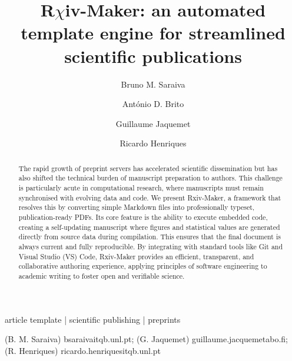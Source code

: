 \documentclass[times, twoside]{rxiv_maker_style}
\begin{document}
\title{{\color{red}R}$\chi$iv-Maker: an automated template engine for streamlined scientific publications}



\author[1,\Letter]{Bruno M. Saraiva}
\author[1]{António D. Brito}
\author[2,3,4,\Letter]{Guillaume Jaquemet}
\author[1,5,\Letter]{Ricardo Henriques}

\maketitle

\begin{abstract}

The rapid growth of preprint servers has accelerated scientific dissemination but has also shifted the technical burden of manuscript preparation to authors. This challenge is particularly acute in computational research, where manuscripts must remain synchronised with evolving data and code. We present Rxiv-Maker, a framework that resolves this by converting simple Markdown files into professionally typeset, publication-ready PDFs. Its core feature is the ability to execute embedded code, creating a self-updating manuscript where figures and statistical values are generated directly from source data during compilation. This ensures that the final document is always current and fully reproducible. By integrating with standard tools like Git and Visual Studio (VS) Code, Rxiv-Maker provides an efficient, transparent, and collaborative authoring experience, applying principles of software engineering to academic writing to foster open and verifiable science.

\end{abstract}

\begin{keywords}
article template | scientific publishing | preprints
\end{keywords}

\begin{corrauthor}
(B. M. Saraiva) bsaraiva\at itqb.unl.pt; 
(G. Jaquemet) guillaume.jacquemet\at abo.fi; 
(R. Henriques) ricardo.henriques\at itqb.unl.pt
\end{corrauthor}
\end{document}
